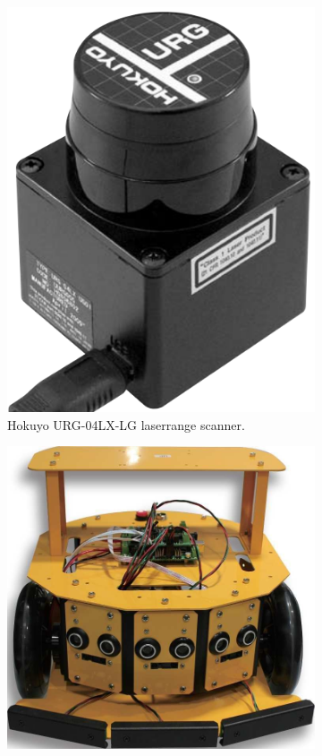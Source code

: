 \begin{figure}[ht]
\centering
  \begin{subfigure}[t]{0.3\textwidth}
    \includegraphics[width = \textwidth]{graphics/hokuyo_laserrange}
    \caption{Hokuyo URG-04LX-LG laserrange scanner.}
    \label{laserrange}
  \end{subfigure}
  \begin{subfigure}[t]{0.4\textwidth}
    \includegraphics[width = \textwidth]{graphics/nexus_robot}

\end{subfigure}
\end{figure}
